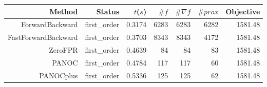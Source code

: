 \begin{tabular}{rrrrrrr}
  \toprule
  \textbf{Method} & \textbf{Status} & \textbf{$t$($s$)} & \textbf{$\#f$} & \textbf{$\#\nabla f$} & \textbf{$\#prox$} & \textbf{Objective} \\
  \midrule
  ForwardBackward & first\_order & 0.3174 & 6283 & 6283 & 6282 & 1581.48 \\
  FastForwardBackward & first\_order & 0.3703 & 8343 & 8343 & 4172 & 1581.48 \\
  ZeroFPR & first\_order & 0.4639 & 84 & 84 & 83 & 1581.48 \\
  PANOC & first\_order & 0.4784 & 117 & 117 & 60 & 1581.48 \\
  PANOCplus & first\_order & 0.5336 & 125 & 125 & 62 & 1581.48 \\
  \bottomrule
\end{tabular}
